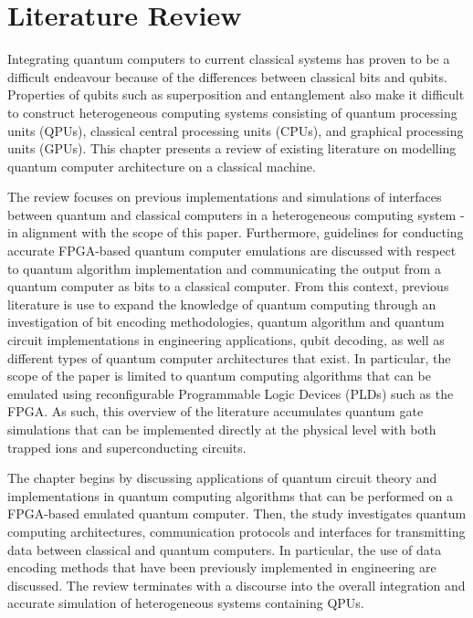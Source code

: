 \chapter{\label{ch:lit_review} Literature Review}

Integrating quantum computers to current classical systems has proven to be a difficult endeavour because of the differences between classical bits and qubits. Properties of qubits such as superposition and entanglement also make it difficult to construct heterogeneous computing systems consisting of quantum processing units (QPUs), classical central processing units (CPUs), and graphical processing units (GPUs). This chapter presents a review of existing literature on modelling quantum computer architecture on a classical machine. 

The review focuses on previous implementations and simulations of interfaces between quantum and classical computers in a heterogeneous computing system - in alignment with the scope of this paper. Furthermore, guidelines for conducting accurate FPGA-based quantum computer emulations are discussed with respect to quantum algorithm implementation and communicating the output from a quantum computer as bits to a classical computer. From this context, previous literature is use to expand the knowledge of quantum computing through an investigation of bit encoding methodologies, quantum algorithm and quantum circuit implementations in engineering applications, qubit decoding, as well as different types of quantum computer architectures that exist. In particular, the scope of the paper is limited to quantum computing algorithms that can be emulated using reconfigurable Programmable Logic Devices (PLDs) such as the FPGA.  As such, this overview of the literature accumulates quantum gate simulations that can be implemented directly at the physical level with both trapped ions and superconducting circuits.

The chapter begins by discussing applications of quantum circuit theory and implementations in quantum computing algorithms that can be performed on a FPGA-based emulated quantum computer. Then, the study investigates quantum computing architectures, communication protocols and interfaces for transmitting data between classical and quantum computers. In particular, the use of data encoding methods that have been previously implemented in engineering are discussed. The review terminates with a discourse into the overall integration and accurate simulation of heterogeneous systems containing QPUs. 

